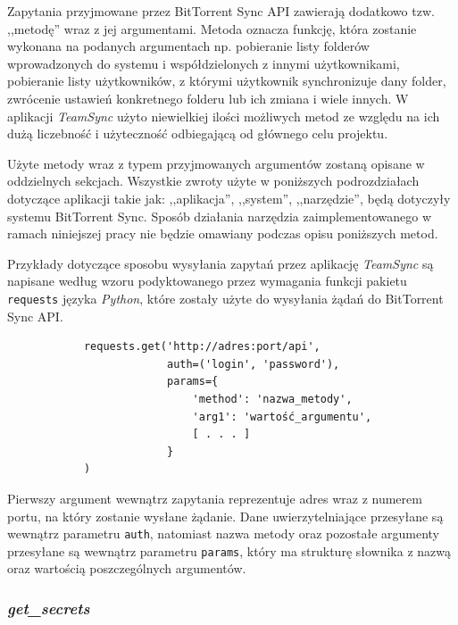 Zapytania przyjmowane przez BitTorrent Sync API zawierają dodatkowo tzw. ,,metodę'' wraz z jej argumentami. Metoda oznacza funkcję, która zostanie wykonana na podanych argumentach np. pobieranie listy folderów wprowadzonych do systemu i współdzielonych z innymi użytkownikami, pobieranie listy użytkowników, z którymi użytkownik synchronizuje dany folder, zwrócenie ustawień konkretnego folderu lub ich zmiana i wiele innych. W aplikacji \emph{TeamSync} użyto niewielkiej ilości możliwych metod ze względu na ich dużą liczebność i użyteczność odbiegającą od głównego celu projektu.

Użyte metody wraz z typem przyjmowanych argumentów zostaną opisane w oddzielnych sekcjach. Wszystkie zwroty użyte w poniższych podrozdziałach dotyczące aplikacji takie jak: ,,aplikacja'', ,,system'', ,,narzędzie'', będą dotyczyły systemu BitTorrent Sync. Sposób działania narzędzia zaimplementowanego w ramach niniejszej pracy nie będzie omawiany podczas opisu poniższych metod.

Przykłady dotyczące sposobu wysyłania zapytań przez aplikację \emph{TeamSync} są napisane według wzoru podyktowanego przez wymagania funkcji pakietu \texttt{requests} języka \emph{Python}, które zostały użyte do wysyłania żądań do BitTorrent Sync API.

\begin{minipage}{\linewidth}
\vspace{15pt}
\begin{verbatim}
            requests.get('http://adres:port/api',
                         auth=('login', 'password'),
                         params={
                             'method': 'nazwa_metody',
                             'arg1': 'wartość_argumentu',
                             [ . . . ]
                         }
            )
\end{verbatim}
\vspace{15pt}
\end{minipage}

Pierwszy argument wewnątrz zapytania reprezentuje adres wraz z numerem portu, na który zostanie wysłane żądanie. Dane uwierzytelniające przesyłane są wewnątrz parametru \texttt{auth}, natomiast nazwa metody oraz pozostałe argumenty przesyłane są wewnątrz parametru \texttt{params}, który ma strukturę słownika z nazwą oraz wartością poszczególnych argumentów.

\subsubsection*{\emph{get\_secrets}}

